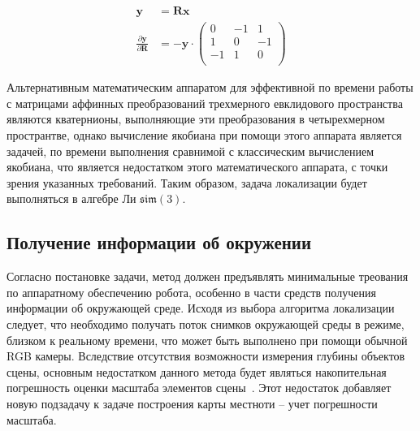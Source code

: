 \begin{itemize}
    \begin{equation}
        \begin{align*}
            \mathbf{y} &= \mathbf{R}\mathbf{x} \\
            \frac{\partial\mathbf{y}}{\partial\mathbf{R}}
            &= -\mathbf{y} \cdot
            \begin{pmatrix}
            0 & -1 & 1 \\
            1 & 0 & -1 \\
            -1 & 1 & 0 \\
            \end{pmatrix}
        \end{align*}
    \end{equation}
\end{itemize}


Альтернативным математическим аппаратом для эффективной по времени работы с матрицами аффинных преобразований трехмерного евклидового пространства являются кватернионы, выполняющие эти преобразования в четырехмерном пространтве, однако вычисление якобиана при помощи этого аппарата является задачей, по времени выполнения сравнимой с классическим вычислением якобиана, что является недостатком этого математического аппарата, с точки зрения указанных требований. Таким образом, задача локализации будет выполняться в алгебре Ли $\mathfrak{sim}(3)$.


\subsection{Получение информации об окружении}
Согласно постановке задачи, метод должен предъявлять минимальные треования по аппаратному обеспечению робота, особенно в части средств получения информации об окружающей среде. Исходя из выбора алгоритма локализации следует, что необходимо получать поток снимков окружающей среды в режиме, близком к реальному времени, что может быть выполнено при помощи обычной RGB камеры. Вследствие отсутствия возможности измерения глубины объектов сцены, основным недостатком данного метода будет являться накопительная погрешность оценки масштаба элементов сцены~\cite{tum3DMonoSLAM}. Этот недостаток добавляет новую подзадачу к задаче построения карты местноти -- учет погрешности масштаба.


